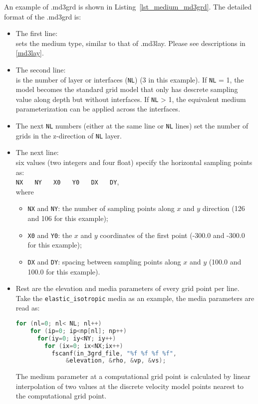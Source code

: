 An example of .md3grd is shown in Listing~\ref{lst_medium_md3grd}. %
The detailed format of the .md3grd is:
\begin{itemize}
  \item The first line: \\
    sets the medium type, similar to that of .md3lay. 
     Please see descriptions in \ref{md3lay}.

   \item The second line: \\
     is the number of layer or interfaces (\texttt{NL}) (3 in this example).
     If \texttt{NL} = 1, the model becomes the standard grid model that
     only has descrete sampling value along depth but without interfaces.
     If \texttt{NL} > 1, the equivalent medium parameterization can be applied across the interfaces.

   \item The next \texttt{NL} numbers (either at the same line or \texttt{NL} lines)
     set the number of grids in the z-direction of \texttt{NL} layer.
  
   \item The next line: \\
      six values (two integers and four float) specify the horizontal sampling points as:\\
      \texttt{NX} ~~ \texttt{NY} ~~ \texttt{X0} ~~ \texttt{Y0} ~~ \texttt{DX} ~~ \texttt{DY}, \\
      where
      \begin{itemize}
        \item \texttt{NX} and \texttt{NY}:
            the number of sampling points along $x$ and $y$ direction (126 and 106 for this example);
        \item \texttt{X0} and \texttt{Y0}: 
          the $x$ and $y$ coordinates of the first point (-300.0 and -300.0 for this example);
        \item \texttt{DX} and \texttt{DY}:
          spacing between sampling points along $x$ and $y$ (100.0 and 100.0 for this example).
      \end{itemize}

  \item Rest are the elevation and media parameters of every grid point per line.
    Take the \texttt{elastic\_isotropic} media as an example,
    the media parameters are read as:
  \begin{lstlisting}[language = C]
  for (nl=0; nl< NL; nl++)
    for (ip=0; ip<np[nl]; np++)
      for(iy=0; iy<NY; iy++)
        for (ix=0; ix<NX;ix++)
          fscanf(in_3grd_file, "%f %f %f %f", 
              &elevation, &rho, &vp, &vs);
  \end{lstlisting}
  The medium parameter at a computational grid point is calculated
    by linear interpolation of two values at the discrete velocity model points
    nearest to the computational grid point.

\end{itemize}


